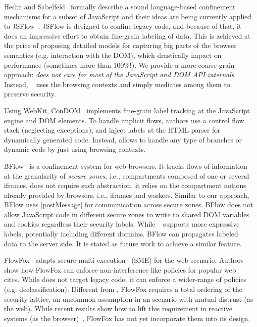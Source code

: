 Hedin and Sabelfeld~\cite{Hedin:2012} formally describe a sound language-based
confinement mechanisms for a subset of JavaScript and their ideas are being
currently applied to JSFlow~\cite{JSFlow}. %
JSFlow is designed to confine legacy code, and because of that, it does an
impressive effort to obtain fine-grain labeling of data. This is achieved at the
price of proposing detailed models for capturing big parts of the browser
semantics (e.g. interaction with the DOM), which drastically impact on
performance (sometimes more than 100\%!).  We provide a more coarse-grain
approach: \emph{\sys{} does not care for most of the JavaScript and DOM API
  internals}. Instead, \sys~ uses the browsing contexts and simply
mediates among them to preserve security.

Using WebKit, ConDOM~\cite{ConDOM} implements fine-grain label tracking at the
JavaScript engine and DOM elements. To handle implicit flows, authors use a
control flow stack (neglecting exceptions), and inject labels at the HTML parser
for dynamically generated code. Instead, \sys{} allows to handle any type of
branches or dynamic code by just using browsing contexts.

BFlow~\cite{Yip:2009:PBS} is a confinement system for web browsers. It tracks
flows of information at the granularity of \emph{secure zones}, i.e.,
compartments composed of one or several iframes.  {\sys} does not require such
abstraction, it relies on the compartment notions already provided by browsers,
i.e., iframes and workers. Similar to our approach, BFlow uses \js|postMessage|
for communication across secure zones. BFlow does not allow JavaScript code in
different secure zones to write to shared DOM variables and cookies regardless
their security labels.  While \sys~ supports more expressive labels, potentially
including different domains, BFlow can propagates labeled data to the server
side. It is stated as future work to achieve a similar feature.

FlowFox~\cite{DeGroef:2012} adapts secure-multi execution~\cite{Devriese:2010}
(SME) for the web scenario. Authors show how FlowFox can enforce
non-interference like policies for popular web cites. While \sys{} does not
target legacy code, it can enforce a wider-range of policies
(e.g. declassification). Different from \sys{}, FlowFox requires a total
ordering of the security lattice, an uncommon assumption in an scenario with
mutual distrust (as the web). While recent results show how to lift this
requirement in reactive systems (as the browser)~\cite{ZanariniJR13}, FlowFox
has not yet incorporate them into its design.




